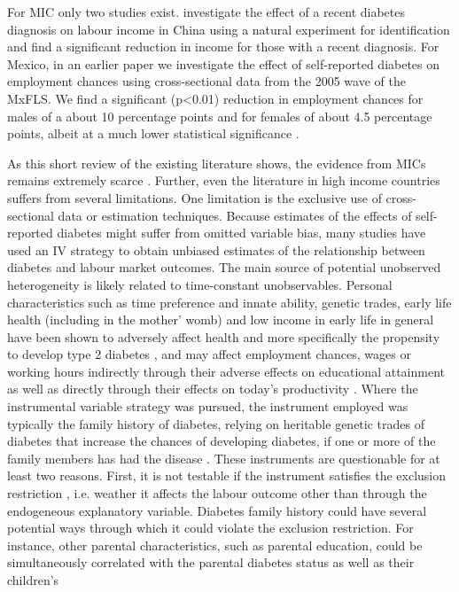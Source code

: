 For \ac{MIC} only two studies exist. \citet{Liu2014} investigate the effect of a recent diabetes diagnosis on labour income
in China using a natural experiment for identification and find a
significant reduction in income for those with a recent diagnosis.
For Mexico, in an earlier paper we investigate the effect of self-reported
diabetes on employment chances using cross-sectional data from the
2005 wave of the \ac{MxFLS}. We find a significant (p<0.01) reduction
in employment chances for males of a about 10 percentage points and
for females of about 4.5 percentage points, albeit at a much lower
statistical significance \citep{Seuring2015}.

As this short review of the existing literature shows, the evidence from \ac{MICs} remains  extremely scarce \citep{Seuring2015a}. Further, even  the literature  in high income countries suffers from several limitations. One limitation is the exclusive use of cross-sectional
data or estimation techniques. Because estimates of the effects of self-reported diabetes might
suffer from omitted variable bias, many studies have used an \ac{IV}
strategy to obtain unbiased estimates of the relationship between
diabetes and labour market outcomes. The main source of potential unobserved heterogeneity is likely related to time-constant unobservables. Personal characteristics such
as time preference and innate ability, genetic trades, early life
health (including in the mother' womb) and low income in early life
in general have been shown to adversely affect health and more specifically
the propensity to develop type 2 diabetes \citep{VanEwijk2011a,Sotomayor2013,Li2010b},
and may affect employment chances, wages or working hours indirectly
through their adverse effects on educational attainment \citep{Ayyagari2011b}
as well as directly through their effects on today's productivity
\citep{Currie2013}. Where the instrumental variable strategy was
pursued, the instrument employed was typically the family history
of diabetes, relying on heritable genetic trades of diabetes that
increase the chances of developing diabetes, if one or more of the family members
has had the disease \citep{Brown2005,Latif2009,Minor2010a,Lin2011b,Seuring2015}.
These instruments are questionable for at least two reasons. First,
it is not testable if the instrument satisfies the exclusion restriction
 , i.e. weather it affects the labour outcome other than through
the endogeneous explanatory variable. Diabetes family history could have several potential ways through which it could violate the exclusion restriction. For instance, other parental characteristics, such as parental education, could be simultaneously correlated with the parental diabetes status as well as their children’s
